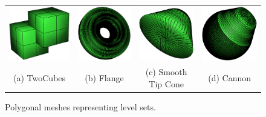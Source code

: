 
\newcommand{\fCYL}   {\emath{f^{Cyl}}}
\newcommand{\fCII}   {\emath{f^{Cyl \times 2}}}
\newcommand{\fPL}    {\emath{f^{Pl}}}
\newcommand{\fPLII}  {\emath{f^{Pl \times 2}}}
\newcommand{\fANN}   {\emath{f^{Ann}}}
\newcommand{\fCN}    {\emath{f^{Cone}}}
\newcommand{\fSCN}   {\emath{f^{SCone}}}
\newcommand{\fTCN}   {\emath{f^{TCone}}}
\newcommand{\fFR}    {\emath{f^{Fr}}}
\newcommand{\fX}     {\emath{f^{X}}}
\newcommand{\fCAN}   {\emath{f^{Can}}}
\newcommand{\NneqII} {\emath{N_{\neq 2}}}




\begin{figure}
\centering
\begin{tabular}{cccc}
\includegraphics[width=1.6in]{images/twocubes_mesh.eps} &
\includegraphics[width=1.6in]{images/flange_mesh.eps} &
\includegraphics[width=1.6in]{images/smooth_tip_cone_mesh.eps} &
\includegraphics[width=1.6in]{images/cannon_mesh.eps}
\\
(a) TwoCubes & (b) Flange & (c) Smooth Tip Cone & (d) Cannon \\
\end{tabular}
\caption{Polygonal meshes representing level sets.}
\label{fig:mesh}
\end{figure}

